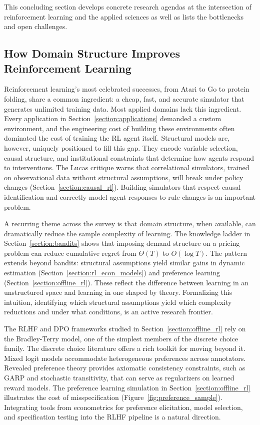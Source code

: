 This concluding section develops concrete research agendas at the intersection of reinforcement learning and the applied sciences as well as lists the bottlenecks and open challenges.

\subsection{How Domain Structure Improves Reinforcement Learning}

Reinforcement learning's most celebrated successes, from Atari to Go to protein folding, share a common ingredient: a cheap, fast, and accurate simulator that generates unlimited training data. Most applied domains lack this ingredient. Every application in Section~\ref{section:applications} demanded a custom environment, and the engineering cost of building these environments often dominated the cost of training the RL agent itself. Structural models are, however, uniquely positioned to fill this gap. They encode variable selection, causal structure, and institutional constraints that determine how agents respond to interventions. The Lucas critique warns that correlational simulators, trained on observational data without structural assumptions, will break under policy changes (Section~\ref{section:causal_rl}). Building simulators that respect causal identification and correctly model agent responses to rule changes is an important problem.

A recurring theme across the survey is that domain structure, when available, can dramatically reduce the sample complexity of learning. The knowledge ladder in Section~\ref{section:bandits} shows that imposing demand structure on a pricing problem can reduce cumulative regret from $\Theta(T)$ to $O(\log T)$. The pattern extends beyond bandits: structural assumptions yield similar gains in dynamic estimation (Section~\ref{section:rl_econ_models}) and preference learning (Section~\ref{section:offline_rl}). These reflect the difference between learning in an unstructured space and learning in one shaped by theory. Formalizing this intuition, identifying which structural assumptions yield which complexity reductions and under what conditions, is an active research frontier.

The RLHF and DPO frameworks studied in Section~\ref{section:offline_rl} rely on the Bradley-Terry model, one of the simplest members of the discrete choice family. The discrete choice literature offers a rich toolkit for moving beyond it. Mixed logit models accommodate heterogeneous preferences across annotators. Revealed preference theory provides axiomatic consistency constraints, such as GARP and stochastic transitivity, that can serve as regularizers on learned reward models. The preference learning simulation in Section~\ref{section:offline_rl} illustrates the cost of misspecification (Figure~\ref{fig:preference_sample}). Integrating tools from econometrics for preference elicitation, model selection, and specification testing into the RLHF pipeline is a natural direction.

